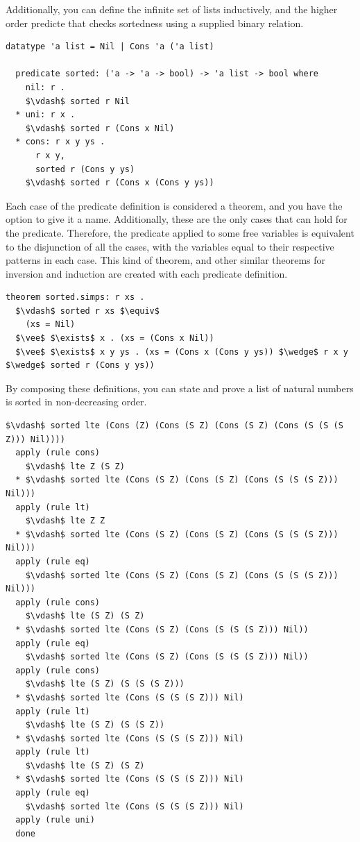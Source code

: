 \documentclass[letterpaper, 11pt]{report}
\begin{document}
Additionally, you can define the infinite set of lists inductively, and the higher order predicte that checks
sortedness using a supplied binary relation.

\begin{lstlisting}[language=logic]
  datatype 'a list = Nil | Cons 'a ('a list)
  
  predicate sorted: ('a -> 'a -> bool) -> 'a list -> bool where
    nil: r . 
    $\vdash$ sorted r Nil
  * uni: r x . 
    $\vdash$ sorted r (Cons x Nil)
  * cons: r x y ys .
      r x y,
      sorted r (Cons y ys)
    $\vdash$ sorted r (Cons x (Cons y ys))
\end{lstlisting}

Each case of the predicate definition is considered a theorem, and you have the option to give it a name. 
Additionally, these are the only cases that can hold for the predicate. Therefore, the predicate applied to some free
variables is equivalent to the disjunction of all the cases, with the variables equal to their respective patterns
in each case. This kind of theorem, and other similar theorems for inversion and induction
are created with each predicate definition.

\begin{lstlisting}[language=logic]
  theorem sorted.simps: r xs .
  $\vdash$ sorted r xs $\equiv$
    (xs = Nil)
  $\vee$ $\exists$ x . (xs = (Cons x Nil))
  $\vee$ $\exists$ x y ys . (xs = (Cons x (Cons y ys)) $\wedge$ r x y $\wedge$ sorted r (Cons y ys))
\end{lstlisting}

By composing these definitions, you can state and prove a list of natural numbers is sorted in non-decreasing order.

\begin{lstlisting}[language=logic]
  $\vdash$ sorted lte (Cons (Z) (Cons (S Z) (Cons (S Z) (Cons (S (S (S Z))) Nil))))
  apply (rule cons)
    $\vdash$ lte Z (S Z)
  * $\vdash$ sorted lte (Cons (S Z) (Cons (S Z) (Cons (S (S (S Z))) Nil)))
  apply (rule lt)
    $\vdash$ lte Z Z
  * $\vdash$ sorted lte (Cons (S Z) (Cons (S Z) (Cons (S (S (S Z))) Nil)))
  apply (rule eq)
    $\vdash$ sorted lte (Cons (S Z) (Cons (S Z) (Cons (S (S (S Z))) Nil)))
  apply (rule cons)
    $\vdash$ lte (S Z) (S Z)
  * $\vdash$ sorted lte (Cons (S Z) (Cons (S (S (S Z))) Nil))
  apply (rule eq)
    $\vdash$ sorted lte (Cons (S Z) (Cons (S (S (S Z))) Nil))
  apply (rule cons)
    $\vdash$ lte (S Z) (S (S (S Z)))
  * $\vdash$ sorted lte (Cons (S (S (S Z))) Nil)
  apply (rule lt)
    $\vdash$ lte (S Z) (S (S Z))
  * $\vdash$ sorted lte (Cons (S (S (S Z))) Nil)
  apply (rule lt)
    $\vdash$ lte (S Z) (S Z)
  * $\vdash$ sorted lte (Cons (S (S (S Z))) Nil)
  apply (rule eq)
    $\vdash$ sorted lte (Cons (S (S (S Z))) Nil)
  apply (rule uni)
  done
\end{lstlisting}
\end{document}
